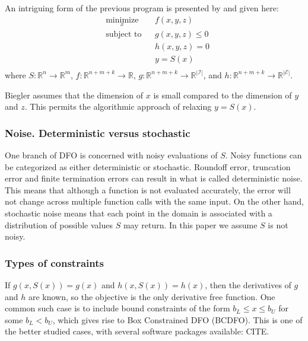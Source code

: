 \documentclass{article}
\begin{document}
\color{red}
An intriguing form of the previous program is presented by \cite{DUMMY:Biegler} and given here:
\begin{equation*}
\begin{aligned}
& \underset{x}{\text{minimize}} & & f(x, y, z) \\
& \text{subject to} & & g(x, y, z) \leq 0 \\
& & & h(x, y, z) = 0 \\
& & & y = S(x) \;  \\
\end{aligned}
\end{equation*}
where
$S : \mathbb{R}^n \to \mathbb{R}^m$,
$f : \mathbb{R}^{n+m+k} \to \mathbb{R}$,
$g : \mathbb{R}^{n+m+k} \to \mathbb{R}^{|\mathcal{I}|}$, and
$h : \mathbb{R}^{n+m+k} \to \mathbb{R}^{|\mathcal{E}|}$.

Biegler assumes that the dimension of $x$ is small compared to the dimension of $y$ and $z$.
This permits the algorithmic approach of relaxing $y=S(x)$.

\color{black}
\underline{\hspace{8cm}}

\subsubsection{Noise. Deterministic versus stochastic}

One branch of DFO is concerned with noisy evaluations of $S$.
Noisy functions can be categorized as either deterministic or stochastic.
Roundoff error, truncation error and finite termination errors can result in what is called deterministic noise. This means that although a function is not evaluated accurately, the error will not change across multiple function calls with the same input.
On the other hand, stochastic noise means that each point in the domain is associated with a distribution of possible values $S$ may return.
In this paper we assume $S$ is not noisy.

\subsubsection{Types of constraints}


If $g(x, S(x)) = g(x)$ and $h(x, S(x)) = h(x)$, then the derivatives of $g$ and $h$ are known, so the objective is the only derivative free function.
One common such case is to include bound constraints of the form $b_{L} \le x \le b_{U}$ for some $b_{L} < b_{U}$, which gives rise to Box Constrained DFO (BCDFO).
This is one of the better studied cases, with several software packages available: CITE.
\end{document}
